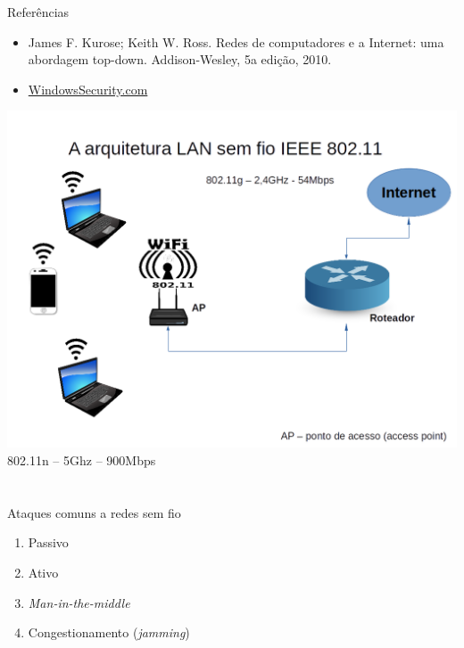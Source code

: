 
\lecturetitle{\course}{\insertlecture}

\frame{\maketitle}

\begin{frame}{Referências}
  
  \begin{itemize}
  \item James F. Kurose; Keith W. Ross. Redes de computadores e a
    Internet: uma abordagem top-down. Addison-Wesley, 5a edição,
    2010.
  \item \href{http://www.windowsecurity.com/}{WindowsSecurity.com}
  \end{itemize}
\end{frame}

\begin{frame}{}
  \includegraphics[scale=.39]{wifi.png}
  {\scriptsize 802.11n --	5Ghz -- 900Mbps}
\end{frame}

\section{\insertlecture}

\begin{frame}{Ataques comuns a redes sem fio}
  \large

  \begin{enumerate}[<+->]
  \item Passivo
  \item Ativo
  \item {\em Man-in-the-middle}
  \item Congestionamento ({\em jamming})
  \end{enumerate}
  
\end{frame}

